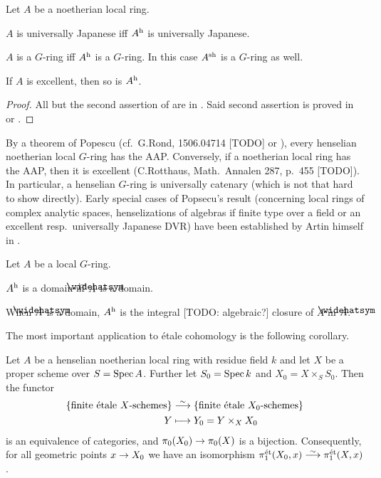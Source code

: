 \documentclass[a4paper, 10pt, oneside, DIV=9, chapterprefix=true, numbers=enddot, bibliography=totoc]{scrbook}
\begin{document}
\begin{fact}
	Let $A$ be a noetherian local ring.
	\begin{alphanumerate}
		\item $A$ is universally Japanese iff $A^{\mathrm{h}}$ is universally Japanese.
		\item $A$ is a $G$-ring iff $A^{\mathrm{h}}$ is a $G$-ring. In this case $A^{\mathrm{sh}}$ is a $G$-ring as well.
		\item If $A$ is excellent, then so is $A^{\mathrm{h}}$.
	\end{alphanumerate}
\end{fact}
\begin{proof}
	All but the second assertion of  are in \cite[(18.7)]{egaIV4}. Said second assertion is proved in \cite[]{stacks-project} or \cite[end of I.1]{kiehlfreitag}.
\end{proof}
\begin{rem}
	By a theorem of Popescu (cf.\ G.Rond, 1506.04714 [TODO] or \cite[]{stacks-project}), every henselian noetherian local $G$-ring has the AAP. Conversely, if a noetherian local ring has the AAP, then it is excellent (C.Rotthaus, Math.\ Annalen 287, p.\ 455 [TODO]). In particular, a henselian $G$-ring is universally catenary (which is not that hard to show directly). Early special cases of Popsecu's result (concerning local rings of complex analytic spaces, henselizations of algebras if finite type over a field or an excellent resp.\ universally Japanese DVR) have been established by Artin himself in \cite{artinApprox}.
\end{rem}
\begin{cor}
	Let $A$ be a local $G$-ring.
	\begin{alphanumerate}
		\item $A^{\mathrm{h}}$ is a domain iff $\roof{A}$ is a domain.
		\item When $\roof{A}$ is a domain, $A^{\mathrm{h}}$ is the integral [TODO: algebraic?] closure of $A$ in $\roof{A}$.
	\end{alphanumerate}
\end{cor}
The most important application to étale cohomology is the following corollary.
\begin{cor}\label{cor:pi1Proper}
	Let $A$ be a henselian noetherian local ring with residue field $k$ and let $X$ be a proper scheme over $S=\operatorname{Spec} A$. Further let $S_0=\operatorname{Spec} k$ and $X_0=X\times_SS_0$. Then the functor
	\begin{align*}
		\left\{\text{finite étale $X$-schemes}\right\}&\isomorphism \left\{\text{finite étale $X_0$-schemes}\right\}\\
		Y&\longmapsto Y_0=Y\times_XX_0
	\end{align*}
	is an equivalence of categories, and $\pi_0(X_0)\morphism\pi_0(X)$ is a bijection. Consequently, for all geometric points $x\morphism X_0$ we have an isomorphism $\pi_1^\et(X_0,x)\isomorphism\pi_1^\et(X,x)$.
\end{cor}
\end{document}
